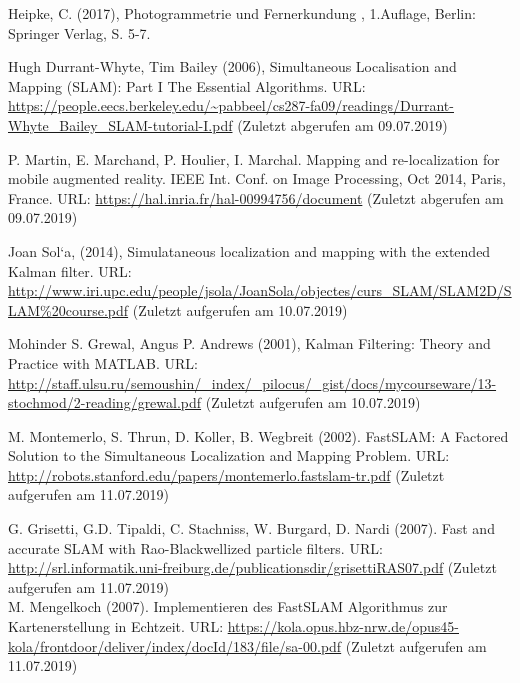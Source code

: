 \documentclass[12pt,oneside]{scrreprt}
\begin{document}
  \begin{thebibliography}{10}
  
  
     Heipke, C. (2017), \glqq Photogrammetrie und Fernerkundung \grqq, 1.Auflage, Berlin: Springer Verlag, S. 5-7.
    
     Hugh Durrant-Whyte, Tim Bailey (2006), Simultaneous Localisation and Mapping (SLAM): Part I The Essential Algorithms. URL: \url{https://people.eecs.berkeley.edu/~pabbeel/cs287-fa09/readings/Durrant-Whyte_Bailey_SLAM-tutorial-I.pdf} (Zuletzt abgerufen am 09.07.2019)
    

	 P. Martin, E. Marchand, P. Houlier, I. Marchal. Mapping and re-localization for mobile augmented reality. IEEE Int. Conf. on Image Processing, Oct 2014, Paris, France.
URL: \url{https://hal.inria.fr/hal-00994756/document} (Zuletzt abgerufen am 09.07.2019) 

	 Joan Sol`a, (2014), Simulataneous localization and mapping with the extended Kalman filter. URL: \url{http://www.iri.upc.edu/people/jsola/JoanSola/objectes/curs_SLAM/SLAM2D/SLAM\%20course.pdf} (Zuletzt aufgerufen am 10.07.2019)
    
     Mohinder S. Grewal, Angus P. Andrews (2001), Kalman Filtering: Theory and Practice with MATLAB. URL: \url{http://staff.ulsu.ru/semoushin/_index/_pilocus/_gist/docs/mycourseware/13-stochmod/2-reading/grewal.pdf} (Zuletzt aufgerufen am 10.07.2019)

	 M. Montemerlo, S. Thrun, D. Koller, B. Wegbreit (2002). FastSLAM: A Factored Solution to the Simultaneous Localization and Mapping Problem. URL: \url{http://robots.stanford.edu/papers/montemerlo.fastslam-tr.pdf} (Zuletzt aufgerufen am 11.07.2019) 
	
	 G. Grisetti, G.D. Tipaldi, C. Stachniss, W. Burgard, D. Nardi (2007). Fast and accurate SLAM with Rao-Blackwellized particle filters. URL: \url{http://srl.informatik.uni-freiburg.de/publicationsdir/grisettiRAS07.pdf} (Zuletzt aufgerufen am 11.07.2019) \\

 M. Mengelkoch (2007). Implementieren des FastSLAM Algorithmus zur
Kartenerstellung in Echtzeit. URL: \url{https://kola.opus.hbz-nrw.de/opus45-kola/frontdoor/deliver/index/docId/183/file/sa-00.pdf} (Zuletzt aufgerufen am 11.07.2019)


\end{thebibliography}
\end{document}
